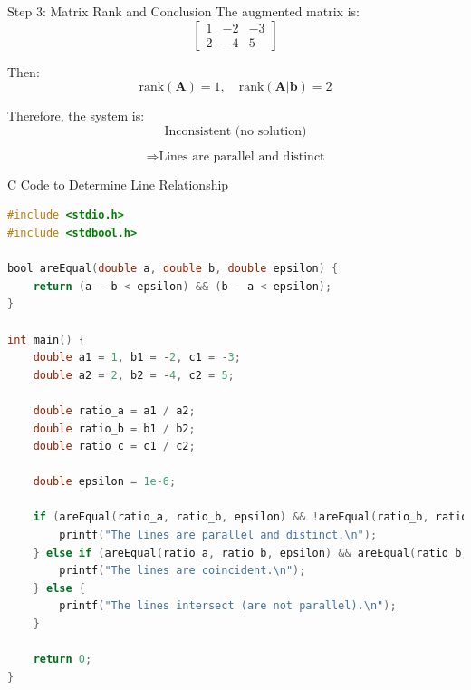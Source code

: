 \documentclass{beamer}
\begin{document}
\begin{frame}{Step 3: Matrix Rank and Conclusion}
The augmented matrix is:
\[
\left[
\begin{array}{cc|c}
1 & -2 & -3 \\
2 & -4 & 5
\end{array}
\right]
\]

Then:
\begin{equation}
\text{rank}(\mathbf{A}) = 1, \quad \text{rank}(\mathbf{A}|\mathbf{b}) = 2
\end{equation}

Therefore, the system is:
\[
\boxed{
\text{Inconsistent (no solution)}
}
\]

\[
\Rightarrow \boxed{
\text{Lines are parallel and distinct}
}
\]
\end{frame}

\begin{frame}[fragile]{C Code to Determine Line Relationship}
\begin{lstlisting}[language=C]
#include <stdio.h>
#include <stdbool.h>

bool areEqual(double a, double b, double epsilon) {
    return (a - b < epsilon) && (b - a < epsilon);
}

int main() {
    double a1 = 1, b1 = -2, c1 = -3;
    double a2 = 2, b2 = -4, c2 = 5;

    double ratio_a = a1 / a2;
    double ratio_b = b1 / b2;
    double ratio_c = c1 / c2;

    double epsilon = 1e-6;

    if (areEqual(ratio_a, ratio_b, epsilon) && !areEqual(ratio_b, ratio_c, epsilon)) {
        printf("The lines are parallel and distinct.\n");
    } else if (areEqual(ratio_a, ratio_b, epsilon) && areEqual(ratio_b, ratio_c, epsilon)) {
        printf("The lines are coincident.\n");
    } else {
        printf("The lines intersect (are not parallel).\n");
    }

    return 0;
}
\end{lstlisting}
\end{frame}
\end{document}
